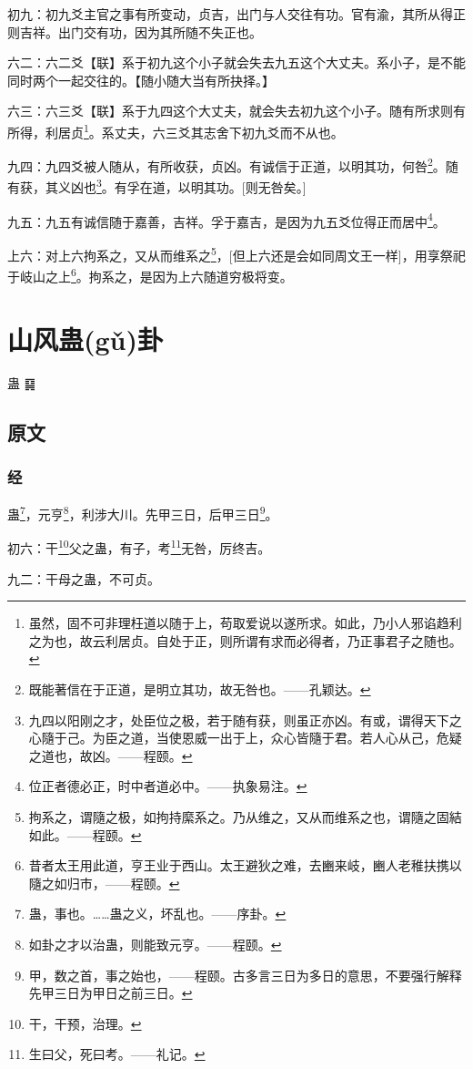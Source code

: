 \documentclass[12pt,oneside]{book}
\begin{document}
初九：初九爻主官之事有所变动，贞吉，出门与人交往有功。官有渝，其所从得正则吉祥。出门交有功，因为其所随不失正也。

六二：六二爻【联】系于初九这个小子就会失去九五这个大丈夫。系小子，是不能同时两个一起交往的。【随小随大当有所抉择。】

六三：六三爻【联】系于九四这个大丈夫，就会失去初九这个小子。随有所求则有所得，利居贞\footnote{虽然，固不可非理枉道以随于上，苟取爱说以遂所求。如此，乃小人邪谄趋利之为也，故云利居贞。自处于正，则所谓有求而必得者，乃正事君子之随也。}。系丈夫，六三爻其志舍下初九爻而不从也。

九四：九四爻被人随从，有所收获，贞凶。有诚信于正道，以明其功，何咎\footnote{既能著信在于正道，是明立其功，故无咎也。——孔颖达。}。随有获，其义凶也\footnote{九四以阳刚之才，处臣位之极，若于随有获，则虽正亦凶。有或，谓得天下之心隨于己。为臣之道，当使恩威一出于上，众心皆隨于君。若人心从己，危疑之道也，故凶。——程颐。}。有孚在道，以明其功。[则无咎矣。]

九五：九五有诚信随于嘉善，吉祥。孚于嘉吉，是因为九五爻位得正而居中\footnote{位正者德必正，时中者道必中。——执象易注。}。

上六：对上六拘系之，又从而维系之\footnote{拘系之，谓隨之极，如拘持縻系之。乃从维之，又从而维系之也，谓隨之固結如此。——程颐。}，[但上六还是会如同周文王一样]，用享祭祀于岐山之上\footnote{昔者太王用此道，亨王业于西山。太王避狄之难，去豳来岐，豳人老稚扶携以隨之如归市，——程颐。}。拘系之，是因为上六随道穷极将变。


\chapter{山风蛊(gǔ)卦}
蛊 {\Large ䷑}

\section{原文}

\subsection{经}
蛊\footnote{蛊，事也。……蛊之义，坏乱也。——序卦。}，元亨\footnote{如卦之才以治蛊，则能致元亨。——程颐。}，利涉大川。先甲三日，后甲三日\footnote{甲，数之首，事之始也，——程颐。古多言三日为多日的意思，不要强行解释先甲三日为甲日之前三日。}。

初六：干\footnote{干，干预，治理。}父之蛊，有子，考\footnote{生曰父，死曰考。——礼记。}无咎，厉终吉。

九二：干母之蛊，不可贞。
\end{document}
